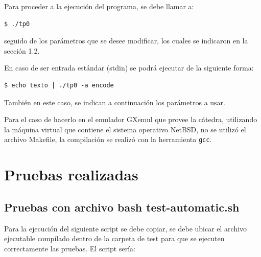 \documentclass[11pt,a4paper]{article}
\begin{document}
Para proceder a la ejecución del programa, se debe llamar a:

\begin{lstlisting}
$ ./tp0
\end{lstlisting}

seguido de los parámetros que se desee modificar, los cuales se indicaron en la sección 1.2.

En caso de ser entrada estándar (stdin) se podrá ejecutar de la siguiente forma:

\begin{lstlisting}
$ echo texto | ./tp0 -a encode
\end{lstlisting}

También en este caso, se indican a continuación los parámetros a usar.

Para el caso de hacerlo en el emulador GXemul que provee la cátedra, utilizando la máquina virtual que contiene el sistema operativo NetBSD, no se utilizó el archivo Makefile, la compilación se realizó con la herramienta \texttt{gcc}.
\newpage


\section{Pruebas realizadas}


\subsection{Pruebas con archivo bash test-automatic.sh}
Para la ejecución del siguiente script se debe copiar, se debe ubicar el archivo ejecutable compilado dentro de la carpeta de test para que se ejecuten correctamente las pruebas. El script sería:
\end{document}
